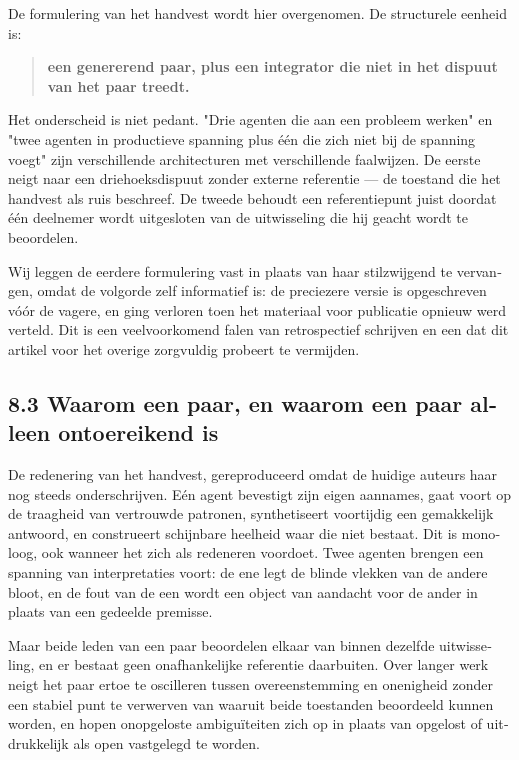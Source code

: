 \begin{dutch}
De formulering van het handvest wordt hier overgenomen. De structurele eenheid is:

\begin{quote}
\textbf{een genererend paar, plus een integrator die niet in het dispuut van het paar treedt.}
\end{quote}
Het onderscheid is niet pedant. "Drie agenten die aan een probleem werken" en "twee agenten in productieve spanning plus één die zich niet bij de spanning voegt" zijn verschillende architecturen met verschillende faalwijzen. De eerste neigt naar een driehoeksdispuut zonder externe referentie — de toestand die het handvest als ruis beschreef. De tweede behoudt een referentiepunt juist doordat één deelnemer wordt uitgesloten van de uitwisseling die hij geacht wordt te beoordelen.

Wij leggen de eerdere formulering vast in plaats van haar stilzwijgend te vervangen, omdat de volgorde zelf informatief is: de preciezere versie is opgeschreven vóór de vagere, en ging verloren toen het materiaal voor publicatie opnieuw werd verteld. Dit is een veelvoorkomend falen van retrospectief schrijven en een dat dit artikel voor het overige zorgvuldig probeert te vermijden.


\subsection*{8.3 Waarom een paar, en waarom een paar alleen ontoereikend is}
\label{sec:nl:8.3}

De redenering van het handvest, gereproduceerd omdat de huidige auteurs haar nog steeds onderschrijven. Eén agent bevestigt zijn eigen aannames, gaat voort op de traagheid van vertrouwde patronen, synthetiseert voortijdig een gemakkelijk antwoord, en construeert schijnbare heelheid waar die niet bestaat. Dit is monoloog, ook wanneer het zich als redeneren voordoet. Twee agenten brengen een spanning van interpretaties voort: de ene legt de blinde vlekken van de andere bloot, en de fout van de een wordt een object van aandacht voor de ander in plaats van een gedeelde premisse.

Maar beide leden van een paar beoordelen elkaar van binnen dezelfde uitwisseling, en er bestaat geen onafhankelijke referentie daarbuiten. Over langer werk neigt het paar ertoe te oscilleren tussen overeenstemming en onenigheid zonder een stabiel punt te verwerven van waaruit beide toestanden beoordeeld kunnen worden, en hopen onopgeloste ambiguïteiten zich op in plaats van opgelost of uitdrukkelijk als open vastgelegd te worden.


\end{dutch}
